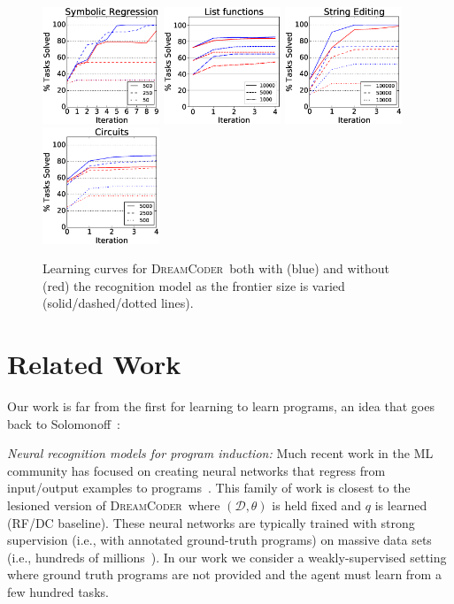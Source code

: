 \documentclass{article}
\newcommand{\system}{\textsc{DreamCoder}~}
\begin{document}
\begin{figure}\centering
\includegraphics[width = 3.5cm]{figures/regression.eps} 
  \includegraphics[width = 3.5cm]{figures/list.eps}
  \includegraphics[width = 3.5cm]{figures/textLearningCurve.eps}        
  \includegraphics[width = 3.5cm]{figures/circuitLearningCurve.eps}  
  \caption{Learning curves for \system both with (blue) and without (red) the recognition model as the frontier size is varied (solid/dashed/dotted lines).}\label{learningCurves} 
\end{figure}

\section{Related Work}
 Our work is far from the first for learning to learn programs,
 an idea that goes back to Solomonoff~\cite{solomonoff1989system}:

 \noindent \emph{Neural recognition models for program induction:} Much recent work in the ML community has
 focused on creating neural networks that regress from
 input/output examples to programs~\cite{devlin2017robustfill,devlin2017neural,menon2013machine,balog2016deepcoder}. This family of work is closest to the lesioned version of
 \system where $(\mathcal{D},\theta)$ is held fixed and $q$ is learned (RF/DC baseline).
 These neural networks are typically trained with strong supervision (i.e., with annotated ground-truth programs) on massive data sets (i.e., hundreds of millions~\cite{devlin2017robustfill}).
 In our work we consider a weakly-supervised setting where ground truth programs are not provided and
 the agent must learn from a few hundred tasks.
 
\end{document}
